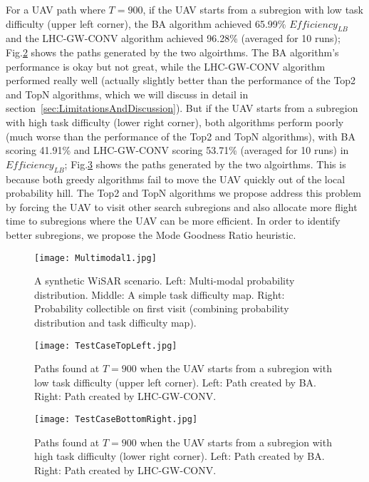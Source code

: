 For a UAV path where $T=900$, if the UAV starts from a subregion with low task difficulty (upper left corner), the BA algorithm achieved 65.99\% $\mathit{Efficiency_{LB}}$ and the LHC-GW-CONV algorithm achieved 96.28\% (averaged for 10 runs); Fig.\ref{SyntheticCasePaths1} shows the paths generated by the two algoirthms. The BA algorithm's performance is okay but not great, while the LHC-GW-CONV algorithm performed really well (actually slightly better than the performance of the Top2 and TopN algorithms, which we will discuss in detail in section~\ref{sec:LimitationsAndDiscussion}). But if the UAV starts from a subregion with high task difficulty (lower right corner), both algorithms perform poorly (much worse than the performance of the Top2 and TopN algorithms), with BA scoring 41.91\% and LHC-GW-CONV scoring 53.71\% (averaged for 10 runs) in $\mathit{Efficiency_{LB}}$; Fig.\ref{SyntheticCasePaths2} shows the paths generated by the two algoirthms. This is because both greedy algorithms fail to move the UAV quickly out of the local probability hill. The Top2 and TopN algorithms we propose address this problem by forcing the UAV to visit other search subregions and also allocate more flight time to subregions where the UAV can be more efficient. In order to identify better subregions, we propose the Mode Goodness Ratio heuristic.
\begin{figure}
\centering
\texttt{[image: Multimodal1.jpg]}
\caption{A synthetic WiSAR scenario. Left: Multi-modal probability distribution. Middle: A simple task difficulty map. Right: Probability collectible on first visit (combining probability distribution and task difficulty map).}
\label{SyntheticCase}
\end{figure}

\begin{figure}
\centering
\texttt{[image: TestCaseTopLeft.jpg]}
\caption{Paths found at $T=900$ when the UAV starts from a subregion with low task difficulty (upper left corner). Left: Path created by BA. Right: Path created by LHC-GW-CONV.}
\label{SyntheticCasePaths1}
\end{figure}

\begin{figure}
\centering
\texttt{[image: TestCaseBottomRight.jpg]}
\caption{Paths found at $T=900$ when the UAV starts from a subregion with high task difficulty (lower right corner). Left: Path created by BA. Right: Path created by LHC-GW-CONV.}
\label{SyntheticCasePaths2}
\end{figure}

